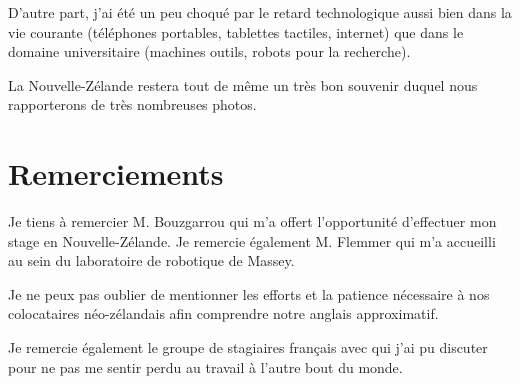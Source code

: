 \documentclass[11pt,journal]{RapportFR}
\newcommand{\Nz}{Nouvelle-Z\'elande\xspace}
\newcommand{\nzs}{n\'eo-z\'elandais\xspace}
\begin{document}
D'autre part, j'ai \'et\'e un peu choqu\'e par le retard technologique aussi bien dans la vie courante (t\'el\'ephones portables, tablettes tactiles, internet) que dans le domaine universitaire (machines outils, robots pour la recherche).

La \Nz restera tout de m\^eme un tr\`es bon souvenir duquel nous rapporterons de tr\`es nombreuses photos.

\section*{Remerciements}

Je tiens \`a remercier M. Bouzgarrou qui m'a offert l'opportunit\'e d'effectuer mon stage en \Nz. 
Je remercie \'egalement M. Flemmer qui m'a accueilli au sein du laboratoire de robotique de Massey.

Je ne peux pas oublier de mentionner les efforts et la patience n\'ecessaire \`a nos colocataires \nzs afin comprendre notre anglais approximatif.

Je remercie \'egalement le groupe de stagiaires fran\c{c}ais avec qui j'ai pu discuter pour ne pas me sentir perdu au travail \`a l'autre bout du monde.

\end{document}
